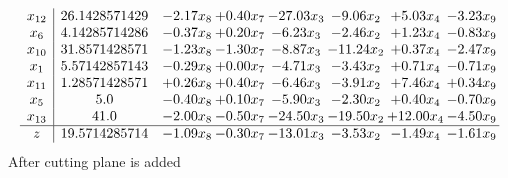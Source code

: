 \documentclass[8pt]{article}
\begin{document}
\[\begin{array}{c| c c@{\hskip 2pt} c@{\hskip 2pt} c@{\hskip 2pt} c@{\hskip 2pt} c@{\hskip 2pt} c@{\hskip 2pt} }
 x_{12}   &  26.1428571429 & -2.17 x_{8} & +  0.40 x_{7} & -27.03 x_{3} & -9.06 x_{2} & +  5.03 x_{4} & -3.23 x_{9}\\
 x_{6}   &  4.14285714286 & -0.37 x_{8} & +  0.20 x_{7} & -6.23 x_{3} & -2.46 x_{2} & +  1.23 x_{4} & -0.83 x_{9}\\
 x_{10}   &  31.8571428571 & -1.23 x_{8} & -1.30 x_{7} & -8.87 x_{3} & -11.24 x_{2} & +  0.37 x_{4} & -2.47 x_{9}\\
 x_{1}   &  5.57142857143 & -0.29 x_{8} & +  0.00 x_{7} & -4.71 x_{3} & -3.43 x_{2} & +  0.71 x_{4} & -0.71 x_{9}\\
 x_{11}   &  1.28571428571 & +  0.26 x_{8} & +  0.40 x_{7} & -6.46 x_{3} & -3.91 x_{2} & +  7.46 x_{4} & +  0.34 x_{9}\\
 x_{5}   &  5.0 & -0.40 x_{8} & +  0.10 x_{7} & -5.90 x_{3} & -2.30 x_{2} & +  0.40 x_{4} & -0.70 x_{9}\\
 x_{13}   &  41.0 & -2.00 x_{8} & -0.50 x_{7} & -24.50 x_{3} & -19.50 x_{2} & + 12.00 x_{4} & -4.50 x_{9}\\
\hline
z    &  19.5714285714 & -1.09 x_{8} & -0.30 x_{7} & -13.01 x_{3} & -3.53 x_{2} & -1.49 x_{4} & -1.61 x_{9}\\
\end{array}\]
 After cutting plane is added 
\end{document}
